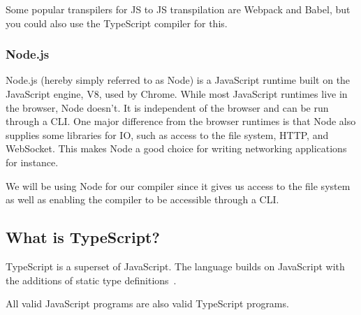Some popular transpilers for JS to JS transpilation are Webpack and Babel, but you could also use the TypeScript compiler for this.

\subsubsection{Node.js}

Node.js (hereby simply referred to as Node) is a JavaScript runtime built on the JavaScript engine, V8, used by Chrome.
While most JavaScript runtimes live in the browser, Node doesn't.
It is independent of the browser and can be run through a CLI.
One major difference from the browser runtimes is that Node also supplies some libraries for IO, such as access to the file system, HTTP, and WebSocket.
This makes Node a good choice for writing networking applications for instance.

We will be using Node for our compiler since it gives us access to the file system as well as enabling the compiler to be accessible through a CLI.

\subsection{What is TypeScript?}\label{subsec:what-is-typescript}

TypeScript is a superset of JavaScript.
The language builds on JavaScript with the additions of static type definitions~\cite{tswebsite}.

All valid JavaScript programs are also valid TypeScript programs.
